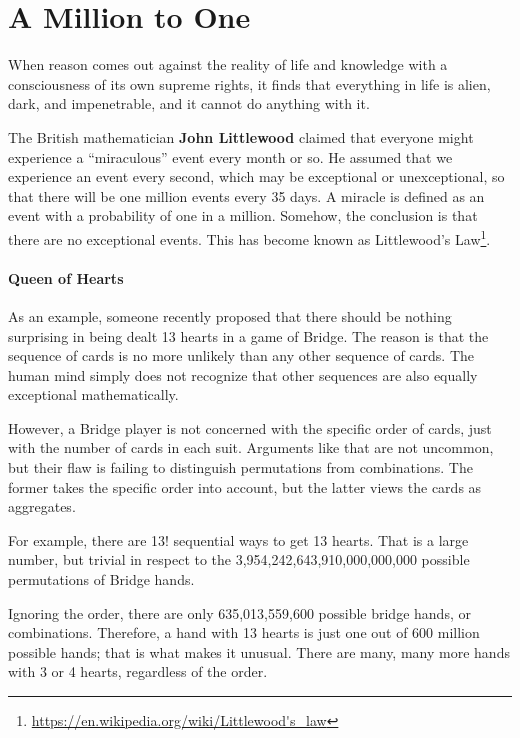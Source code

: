 \section{A Million to One}

\begin{quotex}
When reason comes out against the reality of life and knowledge with a consciousness of its own supreme rights, it finds
that everything in life is alien, dark, and impenetrable, and it cannot do anything with it. 

\end{quotex}

The British mathematician \textbf{John Littlewood} claimed that everyone might experience a “miraculous” event every
month or so. He assumed that we experience an event every second, which may be exceptional or unexceptional, so that
there will be one million events every 35 days. A miracle is defined as an event with a probability of one in a
million. Somehow, the conclusion is that there are no exceptional events. This has become known as
Littlewood's Law\footnote{\url{https://en.wikipedia.org/wiki/Littlewood's_law}}.

\paragraph{Queen of Hearts}
As an example, someone recently proposed that there should be nothing surprising in being dealt 13 hearts in a game of
Bridge. The reason is that the sequence of cards is no more unlikely than any other sequence of cards. The human mind
simply does not recognize that other sequences are also equally exceptional mathematically.

However, a Bridge player is not concerned with the specific order of cards, just with the number of cards in each suit.
Arguments like that are not uncommon, but their flaw is failing to distinguish permutations from combinations. The
former takes the specific order into account, but the latter views the cards as aggregates.

For example, there are 13! sequential ways to get 13 hearts. That is a large number, but trivial in respect to the
3,954,242,643,910,000,000,000 possible permutations of Bridge hands.

Ignoring the order, there are only 635,013,559,600 possible bridge hands, or combinations. Therefore, a hand with 13
hearts is just one out of 600 million possible hands; that is what makes it unusual. There are many, many more hands
with 3 or 4 hearts, regardless of the order.

